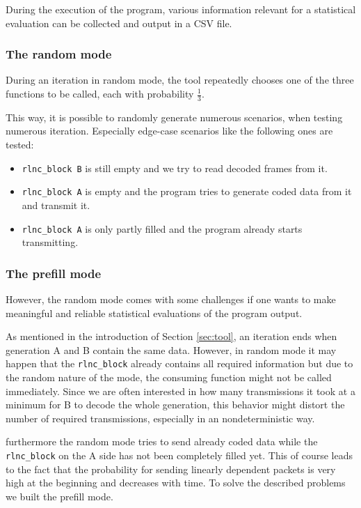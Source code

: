 \documentclass[a4paper,english,10pt]{tumarticle}
\begin{document}
During the execution of the program, various information relevant for a statistical evaluation can be collected and output in a CSV file.

\subsubsection{The random mode}\label{sec:random}
During an iteration in random mode, the tool repeatedly chooses one of the three functions to be called, each with probability $\frac{1}{3}$. 

This way, it is possible to randomly generate numerous scenarios, when testing numerous iteration. 
Especially edge-case scenarios like the following ones are tested:

\begin{itemize}
  \item \texttt{rlnc\_block B} is still empty and we try to read decoded frames from it.
  \item \texttt{rlnc\_block A} is empty and the program tries to generate coded data from it and transmit it.
  \item \texttt{rlnc\_block A} is only partly filled and the program already starts transmitting.
\end{itemize}

\subsubsection{The prefill mode}\label{sec:prefill}
However, the random mode comes with some challenges if one wants to make meaningful and reliable statistical 
evaluations of the program output.

As mentioned in the introduction of Section \ref{sec:tool}, an iteration ends when generation A and B contain the same data. 
However, in random mode it may happen that the \texttt{rlnc\_block} already contains all required information but due
to the random nature of the mode, the consuming function might not be called immediately.
Since we are often interested in how many transmissions it took at a minimum for B to decode the whole generation, this behavior 
might distort the number of required transmissions, especially in an nondeterministic way.

furthermore the random mode tries to send already coded data while the \texttt{rlnc\_block} on the A side has not been completely filled yet. 
This of course leads to the fact that the probability for sending linearly dependent packets is very high at the beginning and 
decreases with time. 
To solve the described problems we built the prefill mode.
\end{document}
